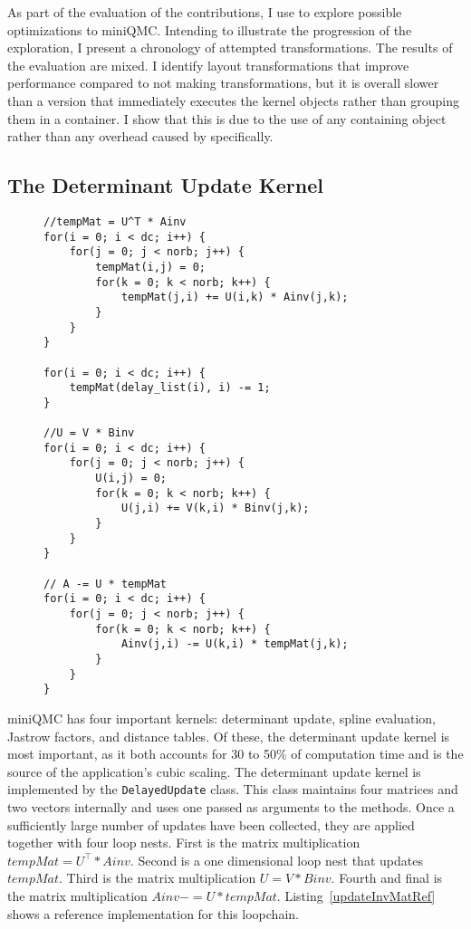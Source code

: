As part of the evaluation of the contributions, I use \FormatDecisions{} to explore possible optimizations to miniQMC\@.
Intending to illustrate the progression of the exploration, I present a chronology of attempted transformations.
The results of the evaluation are mixed.
I identify layout transformations that improve performance compared to not making transformations, but it is overall slower than a version that immediately executes the kernel objects rather than grouping them in a container.
I show that this is due to the use of any containing object rather than any overhead caused by \FormatDecisions{} specifically.

\subsection{The Determinant Update Kernel}

\begin{figure}
\begin{lstlisting}[caption={Main loopchain of the determinant update kernel. Note that the access/storage order here is reversed.},label={updateInvMatRef}]
//tempMat = U^T * Ainv
for(i = 0; i < dc; i++) {
	for(j = 0; j < norb; j++) {
		tempMat(i,j) = 0;
		for(k = 0; k < norb; k++) {
			tempMat(j,i) += U(i,k) * Ainv(j,k);
		}
	}
}

for(i = 0; i < dc; i++) {
	tempMat(delay_list(i), i) -= 1;
}

//U = V * Binv
for(i = 0; i < dc; i++) {
	for(j = 0; j < norb; j++) {
		U(i,j) = 0;
		for(k = 0; k < norb; k++) {
			U(j,i) += V(k,i) * Binv(j,k);
		}
	}
}

// A -= U * tempMat
for(i = 0; i < dc; i++) {
	for(j = 0; j < norb; j++) {
		for(k = 0; k < norb; k++) {
			Ainv(j,i) -= U(k,i) * tempMat(j,k);
		}
	}
}
\end{lstlisting}
\end{figure}

miniQMC has four important kernels: determinant update, spline evaluation, Jastrow factors, and distance tables.
Of these, the determinant update kernel is most important, as it both accounts for 30 to 50\% of computation time and is the source of the application's cubic scaling.
The determinant update kernel is implemented by the \verb.DelayedUpdate. class.
This class maintains four matrices and two vectors internally and uses one passed as arguments to the methods. 
Once a sufficiently large number of updates have been collected, they are applied together with four loop nests.
First is the matrix multiplication $tempMat = U^{\top} * Ainv$.
Second is a one dimensional loop nest that updates $tempMat$.
Third is the matrix multiplication $U = V * Binv$.
Fourth and final is the matrix multiplication $Ainv -= U*tempMat$.
Listing~\ref{updateInvMatRef} shows a reference implementation for this loopchain.

